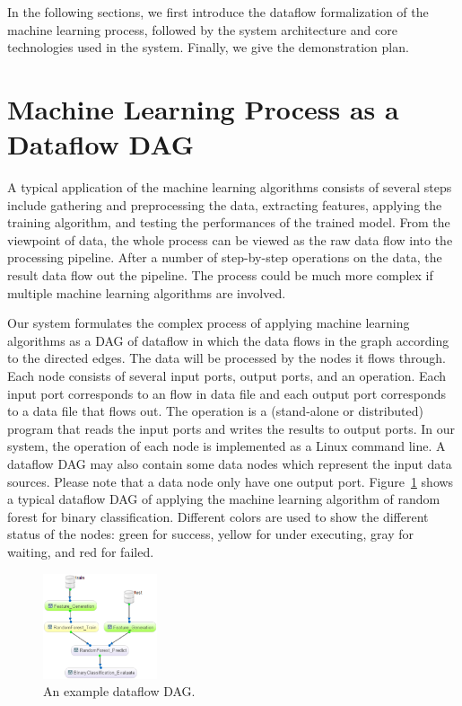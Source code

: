 \documentclass{sig-alternate-05-2015}
\begin{document}
In the following sections, we first introduce the dataflow formalization of the machine learning process, followed by the system architecture and core technologies used in the system. Finally, we give the demonstration plan.

\section{Machine Learning Process as a Dataflow DAG}
A typical application of the machine learning algorithms consists of several steps include gathering and preprocessing the data, extracting features, applying the training algorithm, and testing the performances of the trained model. From the viewpoint of data, the whole process can be viewed as the raw data flow into the processing pipeline. After a number of step-by-step operations on the data, the result data flow out the pipeline. The process could be much more complex if multiple machine learning algorithms are involved.

Our system formulates the complex process of applying machine learning algorithms as a DAG of dataflow in which the data flows in the graph according to the directed edges. The data will be processed by the nodes it flows through. Each node consists of several input ports, output ports, and an operation. Each input port corresponds to an flow in data file and each output port corresponds to a data file that flows out. The operation is a (stand-alone or distributed) program that reads the input ports and writes the results to output ports. In our system, the operation of each node is implemented as a Linux command line. A dataflow DAG may also contain some data nodes which represent the input data sources. Please note that a data node only have one output port. Figure~\ref{fig:dag} shows a typical dataflow DAG of applying the machine learning algorithm of random forest for binary classification. Different colors are used to show the different status of the nodes: green for success, yellow for under executing, gray for waiting, and red for failed.
\begin{figure}
\centering
\includegraphics[width = 0.3\textwidth]{DAG.eps}
\caption{An example dataflow DAG.}
\label{fig:dag}
\end{figure}
\end{document}
